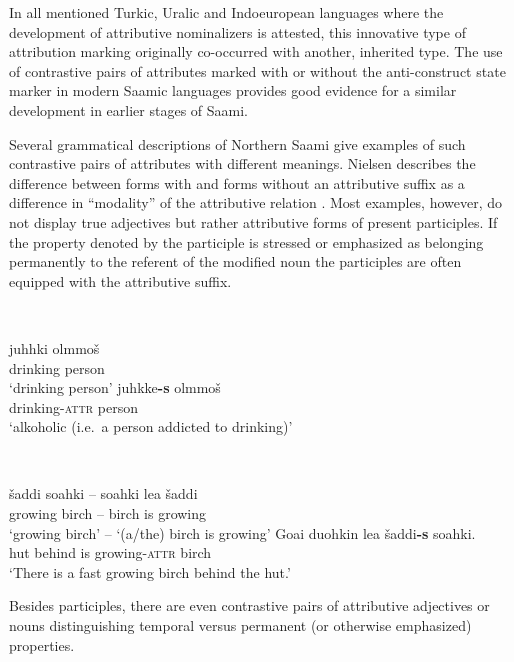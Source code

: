 {In all mentioned Turkic, Uralic and Indoeuropean languages where the development of attributive nominalizers is attested, this innovative type of attribution marking originally co-occurred with another, inherited type. The use of contrastive pairs of attributes marked with or without the anti-construct state marker in modern Saamic languages provides good evidence for a similar development in earlier stages of Saami.

Several grammatical descriptions of Northern Saami give examples of such contrastive pairs of attributes with different meanings. Nielsen describes the difference between forms with and forms without an attributive suffix as a difference in “modality” of the attributive relation \cite[203]{nielsen1945b}. Most examples, however, do not display true adjectives but rather attributive forms of present participles. If the property denoted by the participle is stressed or emphasized as belonging permanently to the referent of the modified noun the participles are often equipped with the attributive suffix.
\begin{exe}
\ex
\begin{xlist}
\ex {}\\
\begin{xlist}
\ex
\gll 	juhhki olmmoš\\
	drinking person\\
\glt	 ‘drinking person’
\ex	
\gll	juhkke\textbf{-s} olmmoš\\
	drinking-\textsc{attr} person\\
\glt	‘alkoholic (i.e.~a person addicted to drinking)’
\end{xlist}
\ex {}\\
\begin{xlist}
\ex 	
\gll	šaddi soahki – soahki lea šaddi\\
 	growing birch – birch is growing\\
\glt	‘growing birch’ – ‘(a/the) birch is growing’
\ex
\gll	Goa{\dj}i duohkin lea šaddi\textbf{-s} soahki.\\
	hut behind is growing-\textsc{attr} birch\\
\glt	‘There is a fast growing birch behind the hut.’
\end{xlist}
\end{xlist}
\end{exe}
Besides participles, there are even contrastive pairs of attributive adjectives or nouns distinguishing temporal versus permanent (or otherwise emphasized) properties.
}

